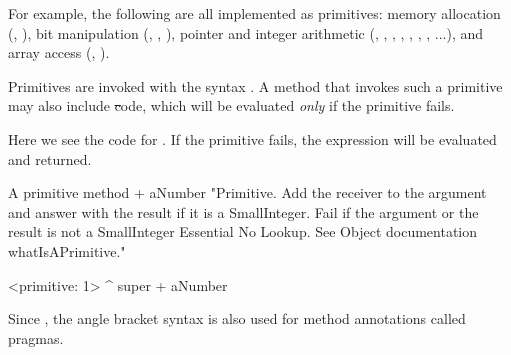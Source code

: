 \documentclass[a4paper,10pt,twoside]{book}
\begin{document}
For example, the following are all implemented as primitives:
memory allocation (, ),
bit manipulation (, , ),
pointer and integer arithmetic (\ct{+}, \ct{-},  \ct{<},  \ct{>}, \ct{*}, \ct{/ }, \ct{=}, \ct{==}...),
and array access (, ).

Primitives are invoked with the syntax .
A method that invokes such a primitive may also include \st code, which will be evaluated \emph{only} if the primitive fails.

Here we see the code for .
If the primitive fails, the expression  will be evaluated and returned.

\begin{method}[primitive]{A primitive method}
+ aNumber 
  "Primitive. Add the receiver to the argument and answer with the result
  if it is a SmallInteger. Fail if the argument or the result is not a
  SmallInteger  Essential  No Lookup. See Object documentation whatIsAPrimitive."

  <primitive: 1>
  ^ super + aNumber
\end{method}





Since , the angle bracket syntax is also used for method annotations called pragmas.
\end{document}
